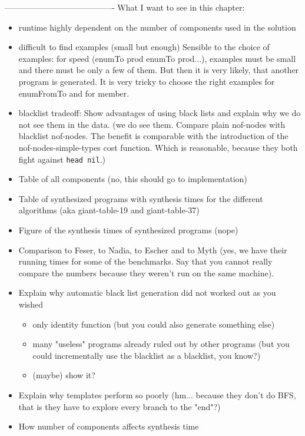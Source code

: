 ----------------------------------------
What I want to see in this chapter:
\begin{itemize}
\item runtime highly dependent on the number of components used in the solution 
\item difficult to find examples (small but enough)
Sensible to the choice of examples: for speed (enumTo prod enumTo prod...), examples must be small and there must be only a few of them. But then it is very likely, that another program is generated. It is very tricky to choose the right examples for enumFromTo and for member.
\item blacklist tradeoff: Show advantages of using black lists and explain why we do not see them in the data. (we do see them. Compare plain nof-nodes with blacklist nof-nodes. The benefit is comparable with the introduction of the nof-nodes-simple-types cost function. Which is reasonable, because they both fight against \lstinline?head nil?.)
\item Table of all components (no, this should go to implementation)
\item Table of synthesized programs with synthesis times for the different algorithms (aka giant-table-19 and giant-table-37)
\item Figure of the synthesis times of synthesized programs (nope)
\item Comparison to Feser, to Nadia, to Escher and to Myth (yes, we have their running times for some of the benchmarks. Say that you cannot really compare the numbers because they weren't run on the same machine).
\item Explain why automatic black list generation did not worked out as you wished
\begin{itemize}
\item only identity function (but you could also generate something else)
\item many "useless" programs already ruled out by other programs (but you could incrementally use the blacklist as a blacklist, you know?)
\item (maybe) show it?
\end{itemize}
\item Explain why templates perform so poorly (hm... because they don't do BFS, that is they have to explore every branch to the "end"?)
\item How number of components affects synthesis time
\begin{itemize}

\end{itemize}
\end{itemize}

